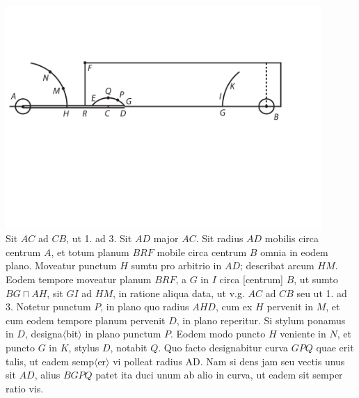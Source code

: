 \pend
\vspace{1.5em}
\pstart
\centering\includegraphics[width=0.9\textwidth]{images/LH03705_216r-d2.pdf}\\
%
\pend 
\vspace{1.5em}
\pstart Sit $AC$ ad $CB$,  ut 1. ad 3. Sit $AD$ major $AC$. Sit radius $AD$ mobilis circa centrum $A$, et totum planum $BRF$ mobile circa centrum $B$ omnia in eodem plano. Moveatur  punctum $H$ sumtu pro arbitrio in $AD$; describat arcum $HM$. Eodem tempore moveatur planum $BRF$, a $G$ in $I$ circa [centrum] $B$, ut sumto $BG \sqcap AH$, sit $GI$ ad $HM$, in ratione aliqua data, ut v.g. $AC$ ad $CB$ seu ut 1. ad 3. Notetur punctum $P$, in plano quo radius $AHD$, cum ex $H$ pervenit in $M$, et cum eodem tempore planum pervenit  $D$, in plano reperitur. Si stylum ponamus in $D$, designa$\langle$bit$\rangle$ in plano punctum $P$. Eodem modo puncto $H$ veniente in $N$, et puncto $G$ in $K$, stylus $D$, notabit $Q$. Quo facto designabitur curva $GPQ$ quae erit talis, ut eadem semp$\langle$er$\rangle$ vi polleat radius AD. Nam si dens jam seu vectis unus sit $AD$, alius $BGPQ$ patet ita duci unum ab alio in curva, ut eadem sit semper ratio  vis. 
